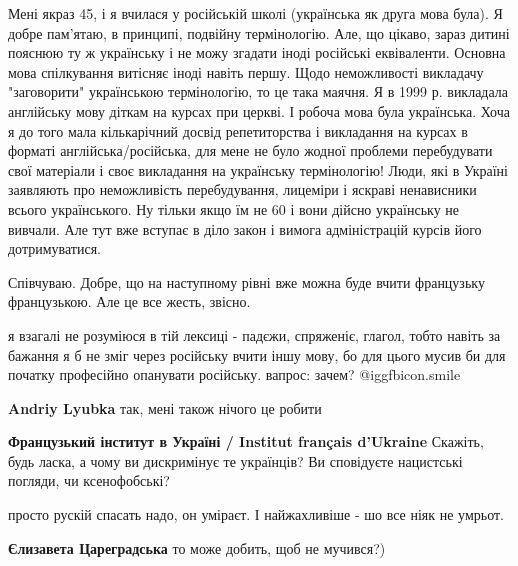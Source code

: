 \begin{itemize}
\begin{itemize}

Мені якраз 45, і я вчилася у російській школі (українська як друга мова була).
Я добре пам'ятаю, в принципі, подвійну термінологію. Але, що цікаво, зараз
дитині пояснюю ту ж українську і не можу згадати іноді російські еквіваленти.
Основна мова спілкування витісняє іноді навіть першу. Щодо неможливості
викладачу "заговорити" українською термінологію, то це така маячня. Я в 1999 р.
викладала англійську мову діткам на курсах при церкві. І робоча мова була
українська. Хоча я до того мала кількарічний досвід репетиторства і викладання
на курсах в форматі англійська/російська, для мене не було жодної проблеми
перебудувати свої матеріали і своє викладання на українську термінологію! Люди,
які в Україні заявляють про неможливість перебудування, лицеміри і яскраві
ненависники всього українського. Ну тільки якщо їм не 60 і вони дійсно
українську не вивчали. Але тут вже вступає в діло закон і вимога адміністрацій
курсів його дотримуватися.

\end{itemize} %

Співчуваю. Добре, що на наступному рівні вже можна буде вчити французьку французькою. Але це все жесть, звісно.


я взагалі не розуміюся в тій лексиці - падєжи, спряженіє, глагол, тобто навіть
за бажання я б не зміг через російську вчити іншу мову, бо для цього мусив би
для початку професійно опанувати російську. вапрос: зачем?  @igg{fbicon.smile} 

\begin{itemize} %
\textbf{Andriy Lyubka} так, мені також нічого це робити
\end{itemize} %

\textbf{Французький інститут в Україні / Institut français d'Ukraine}
Скажіть, будь ласка, а чому ви дискримінує те українців? Ви сповідуєте нацистські погляди, чи ксенофобські?


просто рускій спасать надо, он уміраєт. І найжахливіше - шо все ніяк не умрьот.

\begin{itemize} %
\textbf{Єлизавета Цареградська} то може добить, щоб не мучився?)
\end{itemize} %



\end{itemize}
